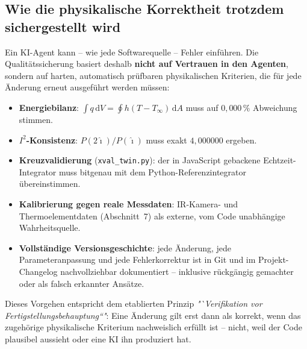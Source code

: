 \documentclass[a4paper,11pt]{article}
\begin{document}
\subsection{Wie die physikalische Korrektheit trotzdem sichergestellt wird}
Ein KI-Agent kann -- wie jede Softwarequelle -- Fehler einführen. Die
Qualitätssicherung basiert deshalb \textbf{nicht auf Vertrauen in den
Agenten}, sondern auf harten, automatisch prüfbaren physikalischen
Kriterien, die für jede Änderung erneut ausgeführt werden müssen:
\begin{itemize}[nosep]
  \item \textbf{Energiebilanz}: $\int q\,\mathrm dV = \oint h(T-T_\infty)\,\mathrm dA$
        muss auf $0{,}000\,\%$ Abweichung stimmen.
  \item \textbf{$I^2$-Konsistenz}: $P(2\hat\imath)/P(\hat\imath)$ muss exakt
        $4{,}000000$ ergeben.
  \item \textbf{Kreuzvalidierung} (\texttt{xval\_twin.py}): der in
        JavaScript gebackene Echtzeit-Integrator muss bitgenau mit dem
        Python-Referenzintegrator übereinstimmen.
  \item \textbf{Kalibrierung gegen reale Messdaten}: IR-Kamera- und
        Thermoelementdaten (Abschnitt~7) als externe, vom Code unabhängige
        Wahrheitsquelle.
  \item \textbf{Vollständige Versionsgeschichte}: jede Änderung, jede
        Parameteranpassung und jede Fehlerkorrektur ist in Git und im
        Projekt-Changelog nachvollziehbar dokumentiert -- inklusive
        rückgängig gemachter oder als falsch erkannter Ansätze.
\end{itemize}
Dieses Vorgehen entspricht dem etablierten Prinzip \emph{"`Verifikation vor
Fertigstellungsbehauptung“"}: Eine Änderung gilt erst dann als korrekt, wenn
das zugehörige physikalische Kriterium nachweislich erfüllt ist -- nicht,
weil der Code plausibel aussieht oder eine KI ihn produziert hat.
\end{document}
